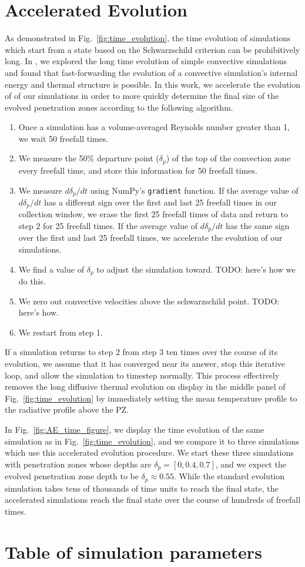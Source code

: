 \documentclass{aastex631}
\begin{document}
\section{Accelerated Evolution}
\label{app:accelerated_evolution}
As demonstrated in Fig.~\ref{fig:time_evolution}, the time evolution of simulations which start from a state based on the Schwarzschild criterion can be prohibitively long.
In \citet{anders_etal_2018}, we explored the long time evolution of simple convective simulations and found that fast-forwarding the evolution of a convective simulation's internal energy and thermal structure is possible.
In this work, we accelerate the evolution of of our simulations in order to more quickly determine the final size of the evolved penetration zones according to the following algorithm.
\begin{enumerate}
\item Once a simulation has a volume-averaged Reynolds number greater than 1, we wait 50 freefall times.
\item We measure the 50\% departure point ($\delta_p$) of the top of the convection zone every freefall time, and store this information for 50 freefall times.
\item We measure $d\delta_p/dt$ using NumPy's \texttt{gradient} function. 
If the average value of $d\delta_p/dt$ has a different sign over the first and last 25 freefall times in our collection window, we erase the first 25 freefall times of data and return to step 2 for 25 freefall times.
If the average value of $d\delta_p/dt$ has the same sign over the first and last 25 freefall times, we accelerate the evolution of our simulations.
\item We find a value of $\delta_p$ to adjust the simulation toward. TODO: here's how we do this.
\item We zero out convective velocities above the schwarzschild point. TODO: here's how.
\item We restart from step 1.
\end{enumerate}
If a simulation returns to step 2 from step 3 ten times over the course of its evolution, we assume that it has converged near its answer, stop this iterative loop, and allow the simulation to timestep normally.
This process effectively removes the long diffusive thermal evolution on display in the middle panel of Fig.~\ref{fig:time_evolution} by immediately setting the mean temperature profile to the radiative profile above the PZ.

In Fig.~\ref{fig:AE_time_figure}, we display the time evolution of the same simulation as in Fig.~\ref{fig:time_evolution}, and we compare it to three simulations which use this accelerated evolution procedure.
We start these three simulations with penetration zones whose depths are $\delta_p = [0, 0.4, 0.7]$, and we expect the evolved penetration zone depth to be $\delta_p \approx 0.55$.
While the standard evolution simulation takes tens of thousands of time units to reach the final state, the accelerated simulations reach the final state over the course of hundreds of freefall times.

\section{Table of simulation parameters}
\label{app:simulation_table}







\end{document}
